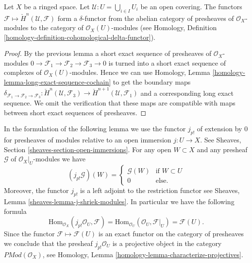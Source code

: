 \begin{lemma}
\label{lemma-cech-cohomology-delta-functor-presheaves}
Let $X$ be a ringed space.
Let $\mathcal{U} : U = \bigcup_{i \in I} U_i$ be an open covering.
The functors $\mathcal{F} \mapsto \check{H}^n(\mathcal{U}, \mathcal{F})$
form a $\delta$-functor from the abelian category of
presheaves of $\mathcal{O}_X$-modules to the category
of $\mathcal{O}_X(U)$-modules (see
Homology, Definition \ref{homology-definition-cohomological-delta-functor}).
\end{lemma}

\begin{proof}
By the previous lemma a short exact sequence of presheaves of
$\mathcal{O}_X$-modules
$0 \to \mathcal{F}_1 \to \mathcal{F}_2 \to \mathcal{F}_3 \to 0$
is turned into a short exact sequence of complexes of
$\mathcal{O}_X(U)$-modules. Hence we can use
Homology, Lemma \ref{homology-lemma-long-exact-sequence-cochain}
to get the boundary maps
$\delta_{\mathcal{F}_1 \to \mathcal{F}_2 \to \mathcal{F}_3} :
\check{H}^n(\mathcal{U}, \mathcal{F}_3) \to 
\check{H}^{n + 1}(\mathcal{U}, \mathcal{F}_1)$
and a corresponding long exact sequence. We omit the verification
that these maps are compatible with maps between short exact
sequences of presheaves.
\end{proof}


\noindent
In the formulation of the following lemma we use the functor $j_{p!}$ of
extension by $0$ for presheaves of modules
relative to an open immersion $j : U \to X$.
See Sheaves, Section \ref{sheaves-section-open-immersions}. For any open
$W \subset X$ and any presheaf $\mathcal{G}$ of $\mathcal{O}_X|_U$-modules
we have
$$
(j_{p!}\mathcal{G})(W) = 
\left\{
\begin{matrix}
\mathcal{G}(W) & \text{if } W \subset U \\
0 & \text{else.}
\end{matrix}
\right.
$$
Moreover, the functor $j_{p!}$ is a left adjoint to the restriction functor
see Sheaves, Lemma \ref{sheaves-lemma-j-shriek-modules}.
In particular we have the following formula
$$
\text{Hom}_{\mathcal{O}_X}(j_{p!}\mathcal{O}_U, \mathcal{F})
=
\text{Hom}_{\mathcal{O}_U}(\mathcal{O}_U, \mathcal{F}|_U)
=
\mathcal{F}(U).
$$
Since the functor $\mathcal{F} \mapsto \mathcal{F}(U)$ is an exact functor
on the category of presheaves we conclude that the presheaf
$j_{p!}\mathcal{O}_U$ is a projective object in the category
$\textit{PMod}(\mathcal{O}_X)$, see
Homology, Lemma \ref{homology-lemma-characterize-projectives}.

